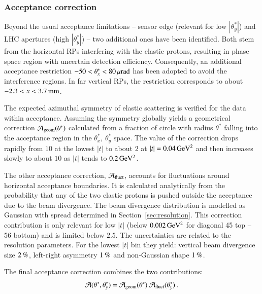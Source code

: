 


\subsubsection{Acceptance correction}
\label{sec:acc corr}

Beyond the usual acceptance limitations -- sensor edge (relevant for low $|\theta^*_y|$) and LHC apertures (high $|\theta_y^*|$) -- two additional ones have been identified. Both stem from the horizontal RPs interfering with the elastic protons, resulting in phase space region with uncertain detection efficiency. Consequently, an additional acceptance restriction $-50 < \theta_x^* < 80\,{\rm \mu rad}$ has been adopted to avoid the interference regions. In far vertical RPs, the restriction corresponds to about $-2.3 < x < 3.7\,{\rm mm}$.

The expected azimuthal symmetry of elastic scattering is verified for the data within acceptance. Assuming the symmetry globally yields a geometrical correction ${\cal A}_{\rm geom}(\theta^*)$ calculated from a fraction of circle with radius $\theta^*$ falling into the acceptance region in the $\theta_x^*$, $\theta_y^*$ space. The value of the correction drops rapidly from $10$ at the lowest $|t|$ to about $2$ at $|t| = 0.04\,{\rm GeV^2}$ and then increases slowly to about $10$ as $|t|$ tends to $0.2\,{\rm GeV^2}$.

The other acceptance correction, ${\cal A}_{\rm fluct}$, accounts for fluctuations around horizontal acceptance boundaries. It is calculated analytically from the probability that any of the two elastic protons is pushed outside the acceptance due to the beam divergence. The beam divergence distribution is modelled as Gaussian with spread determined in Section~\ref{sec:resolution}. This correction contribution is only relevant for low $|t|$ (below $0.002\,{\rm GeV^2}$ for diagonal 45 top -- 56 bottom) and is limited below $2.5$. The uncertainties are related to the resolution parameters. For the lowest $|t|$ bin they yield: vertical beam divergence size $2\,{\rm \%}$, left-right asymmetry $1\,{\rm \%}$ and non-Gaussian shape $1\,{\rm \%}$.

The final acceptance correction combines the two contributions:
\begin{equation}
{\cal A}(\theta^*, \theta_y^*) = {\cal A}_{\rm geom}(\theta^*)\ {\cal A}_{\rm fluct}(\theta_y^*)\ .
\end{equation}

